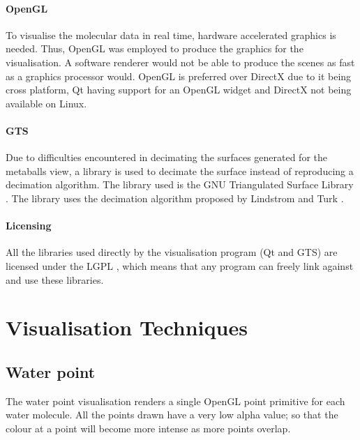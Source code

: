 
\paragraph{OpenGL}

To visualise the molecular data in real time, hardware accelerated graphics is
needed. Thus, OpenGL \citep{OpenGL} was employed to produce the graphics for
the visualisation. A software renderer would not be able to produce the scenes
as fast as a graphics processor would. OpenGL is preferred over DirectX due to
it being cross platform, Qt having support for an OpenGL widget and DirectX not
being available on Linux.


\paragraph{GTS}

Due to difficulties encountered in decimating the surfaces generated for the
metaballs view, a library is used to decimate the surface instead of
reproducing a decimation algorithm. The library used is the GNU Triangulated
Surface Library \citep{GTS}. The library uses the decimation algorithm proposed
by Lindstrom and Turk \citep{lindstrom98}.


\paragraph{Licensing}

All the libraries used directly by the visualisation program (Qt and GTS) are
licensed under the LGPL \citep{LGPL}, which means that any program can freely
link against and use these libraries.



\section{Visualisation Techniques}
\label{sec:implementation_techniques}

\subsection*{Water point}

The water point visualisation renders a single OpenGL point primitive for each
water molecule. All the points drawn have a very low alpha value; so that the
colour at a point will become more intense as more points overlap.

